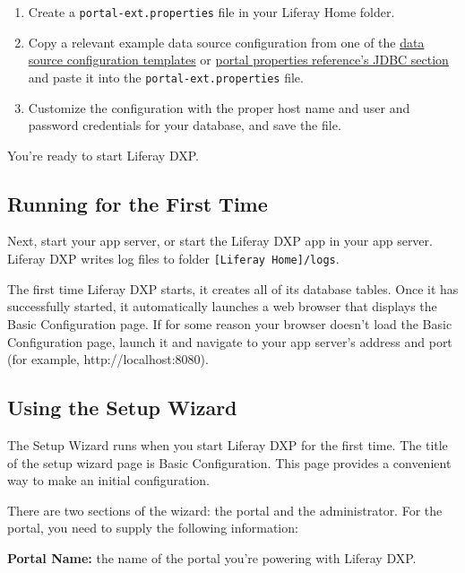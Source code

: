 \begin{enumerate}
\def\labelenumi{\arabic{enumi}.}
\item
  Create a \texttt{portal-ext.properties} file in your Liferay Home
  folder.
\item
  Copy a relevant example data source configuration from one of the
  \href{/docs/7-1/deploy/-/knowledge_base/d/database-templates}{data
  source configuration templates} or
  \href{https://docs.liferay.com/dxp/portal/7.1-latest/propertiesdoc/portal.properties.html\#JDBC}{portal
  properties reference's JDBC section} and paste it into the
  \texttt{portal-ext.properties} file.
\item
  Customize the configuration with the proper host name and user and
  password credentials for your database, and save the file.
\end{enumerate}

You're ready to start Liferay DXP.

\subsection{Running for the First
Time}\label{running-for-the-first-time}

Next, start your app server, or start the Liferay DXP app in your app
server. Liferay DXP writes log files to folder
\texttt{{[}Liferay\ Home{]}/logs}.

The first time Liferay DXP starts, it creates all of its database
tables. Once it has successfully started, it automatically launches a
web browser that displays the Basic Configuration page. If for some
reason your browser doesn't load the Basic Configuration page, launch it
and navigate to your app server's address and port (for example,
http://localhost:8080).

\subsection{Using the Setup Wizard}\label{using-the-setup-wizard}

The Setup Wizard runs when you start Liferay DXP for the first time. The
title of the setup wizard page is Basic Configuration. This page
provides a convenient way to make an initial configuration.

There are two sections of the wizard: the portal and the administrator.
For the portal, you need to supply the following information:

\textbf{Portal Name:} the name of the portal you're powering with
Liferay DXP.

